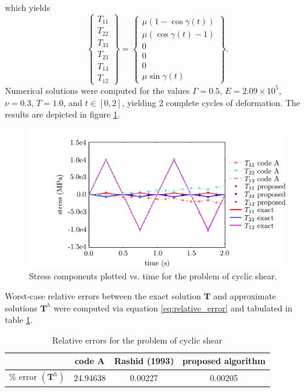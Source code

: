 which yields
\begin{equation}
    \left\{ \begin{array}{c} T_{11} \\ T_{22} \\ T_{33} \\ T_{23} \\ T_{13} \\ T_{12} \end{array} \right\} = \left\{ \begin{array}{c} \mu (1-\cos \gamma (t)) \\ \mu (\cos \gamma (t) - 1) \\ 0 \\ 0 \\ 0 \\ \mu \sin \gamma (t) \end{array} \right\}.
\end{equation}
Numerical solutions were computed for the values $\Gamma = 0.5$, $E = 2.09 \times 10^5$, $\nu = 0.3$, $T = 1.0$, and $t \in \left[ 0, 2 \right]$, yielding 2 complete cycles of deformation. The results are depicted in figure \ref{fig.cyclic_shear-cm1}.

\begin{figure}
\centering
\includegraphics[scale=0.75]{media/cyclic_shear.pdf}
\caption{Stress components plotted vs. time for the problem of cyclic shear.}
\label{fig.cyclic_shear-cm1}
\end{figure}

Worst-case relative errors between the exact solution $\mathbf{T}$ and approximate solutions $\mathbf{T}^h$ were computed via equation \ref{eq:relative_error} and tabulated in table \ref{tab.cyclic_shear-cm1}.

\begin{table}[]
\centering
\caption{Relative errors for the problem of cyclic shear}
\label{tab.cyclic_shear-cm1}
\begin{tabular}{c|c|c|c}
& code A & Rashid (1993) & proposed algorithm  \\ \hline
\% error $(\mathbf{T}^h)$ & 24.94638 & 0.00227 & 0.00205
\end{tabular}
\end{table}

